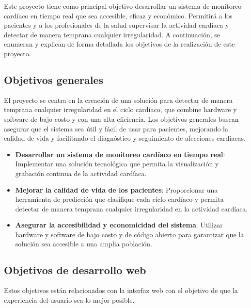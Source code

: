 
Este proyecto tiene como principal objetivo desarrollar un sistema de monitoreo cardíaco en tiempo real que sea accesible, eficaz y económico. Permitirá a los pacientes y a los profesionales de la salud supervisar la actividad cardíaca y detectar de manera temprana cualquier irregularidad. A continuación, se enumeran y explican de forma detallada los objetivos de la realización de este proyecto.

\subsection{Objetivos generales}

El proyecto se centra en la creación de una solución para detectar de manera temprana cualquier irregularidad en el ciclo cardíaco, que combine hardware y software de bajo costo y con una alta eficiencia. Los objetivos generales buscan asegurar que el sistema sea útil y fácil de usar para pacientes, mejorando la calidad de vida y facilitando el diagnóstico y seguimiento de afecciones cardíacas.

\begin{itemize}
\item \textbf{Desarrollar un sistema de monitoreo cardíaco en tiempo real}: Implementar una solución tecnológica que permita la visualización y grabación continua de la actividad cardíaca.
\item \textbf{Mejorar la calidad de vida de los pacientes}: Proporcionar una herramienta de predicción que clasifique cada ciclo cardíaco y permita detectar de manera temprana cualquier irregularidad en la actividad cardíaca.
\item \textbf{Asegurar la accesibilidad y economicidad del sistema}: Utilizar hardware y software de bajo costo y de código abierto para garantizar que la solución sea accesible a una amplia población.
\end{itemize}

\subsection{Objetivos de desarrollo web}

Estos objetivos están relacionados con  la interfaz web con el objetivo de que la experiencia del usuario sea lo mejor posible.

